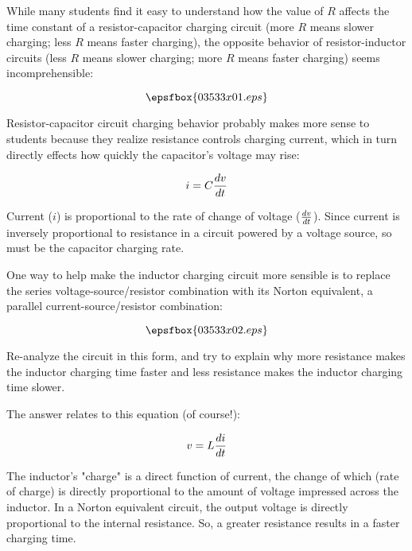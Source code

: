 

While many students find it easy to understand how the value of $R$ affects the time constant of a resistor-capacitor charging circuit (more $R$ means slower charging; less $R$ means faster charging), the opposite behavior of resistor-inductor circuits (less $R$ means slower charging; more $R$ means faster charging) seems incomprehensible:

$$\epsfbox{03533x01.eps}$$

Resistor-capacitor circuit charging behavior probably makes more sense to students because they realize resistance controls charging current, which in turn directly effects how quickly the capacitor's voltage may rise:

$$i = C {dv \over dt}$$

Current ($i$) is proportional to the rate of change of voltage ($dv \over dt$).  Since current is inversely proportional to resistance in a circuit powered by a voltage source, so must be the capacitor charging rate.

\vskip 10pt

One way to help make the inductor charging circuit more sensible is to replace the series voltage-source/resistor combination with its Norton equivalent, a parallel current-source/resistor combination:

$$\epsfbox{03533x02.eps}$$

Re-analyze the circuit in this form, and try to explain why more resistance makes the inductor charging time faster and less resistance makes the inductor charging time slower.







The answer relates to this equation (of course!):

$$v = L {di \over dt}$$

The inductor's "charge" is a direct function of current, the change of which (rate of charge) is directly proportional to the amount of voltage impressed across the inductor.  In a Norton equivalent circuit, the output voltage is directly proportional to the internal resistance.  So, a greater resistance results in a faster charging time.

